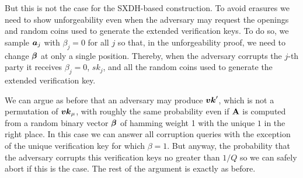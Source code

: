 But this is not the case for the SXDH-based construction.
To avoid erasures we need to show unforgeability even when the adversary may request the openings and random coins used to generate the extended verification keys. To do so, we sample ${\boldsymbol{a}}_j$ with $\beta_j=0$ for all $j$ so that, in the unforgeability proof, we need to change ${\boldsymbol{\beta}}$ at only a single position. Thereby, when the adversary corrupts the $j$-th party it receives $\beta_j=0$, $sk_j$, and all the random coins used to generate the extended verification key.

We can argue as before that an adversary may produce ${\boldsymbol{vk}}'$, which is not a permutation of ${\boldsymbol{vk}}_\mu$,
with roughly the same probability even if $\mathbf{{A}}$ is computed from a random binary vector ${\boldsymbol{\beta}}$ of hamming weight 1 with the unique $1$ in the right place. In this case we can answer all corruption queries with the exception of the unique verification key for which $\beta=1$. But anyway, the probability that the adversary corrupts this verification keys no greater than $1/Q$ so we can safely abort if this is the case. The rest of the argument is exactly as before.





